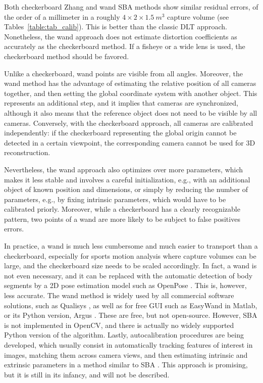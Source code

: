 Both checkerboard Zhang and wand SBA methods show similar residual errors, of the order of a millimeter in a roughly $4\times 2 \times 1.5\ m^3$ capture volume \cite{Pribanic2009,Silvatti2012} (see Tables~\ref{table:tab_calib}). This is better than the classic DLT approach. Nonetheless, the wand approach does not estimate distortion coefficients as accurately as the checkerboard method. If a fisheye or a wide lens is used, the checkerboard method should be favored.

Unlike a checkerboard, wand points are visible from all angles. Moreover, the wand method has the advantage of estimating the relative position of all cameras together, and then setting the global coordinate system with another object. This represents an additional step, and it implies that cameras are synchronized, although it also means that the reference object does not need to be visible by all cameras. Conversely, with the checkerboard approach, all cameras are calibrated independently: if the checkerboard representing the global origin cannot be detected in a certain viewpoint, the corresponding camera cannot be used for 3D reconstruction. 

Nevertheless, the wand approach also optimizes over more parameters, which makes it less stable and involves a careful initialization, e.g., with an additional object of known position and dimensions, or simply by reducing the number of parameters, e.g., by fixing intrinsic parameters, which would have to be calibrated priorly. Moreover, while a checkerboard has a clearly recognizable pattern, two points of a wand are more likely to be subject to false positives errors.

In practice, a wand is much less cumbersome and much easier to transport than a checkerboard, especially for sports motion analysis where capture volumes can be large, and the checkerboard size needs to be scaled accordingly. In fact, a wand is not even necessary, and it can be replaced with the automatic detection of body segments by a 2D pose estimation model such as OpenPose \cite{Takahashi2018, Xu2021, Liu2022a}. This is, however, less accurate. The wand method is widely used by all commercial software solutions, such as Qualisys \cite{Qualisys}, as well as for free GUI such as EasyWand \cite{Theriault2014} in Matlab, or its Python version, Argus \cite{Argus,Jackson2016}. These are free, but not open-source. However, SBA is not implemented in OpenCV, and there is actually no widely supported Python version of the algorithm. Lastly, autocalibration procedures are being developed, which usually consist in automatically tracking features of interest in images, matching them across camera views, and then estimating intrinsic and extrinsic parameters in a method similar to SBA \cite{Faugeras1992,Hartley2003}. This approach is promising, but it is still in its infancy, and will not be described.

